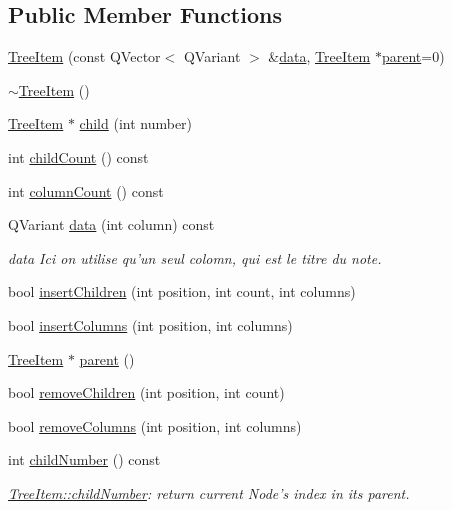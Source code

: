 \subsection*{Public Member Functions}
\begin{DoxyCompactItemize}
\item 
\hyperlink{class_tree_item_a1e3a29cf1a0d6ff0bbc2d2ef41723a13}{Tree\-Item} (const Q\-Vector$<$ Q\-Variant $>$ \&\hyperlink{class_tree_item_a16641e42c78f004d47a66f3b2c39341f}{data}, \hyperlink{class_tree_item}{Tree\-Item} $\ast$\hyperlink{class_tree_item_a392ec493dfab91ee474d7ff83e2c0211}{parent}=0)
\item 
\hyperlink{class_tree_item_a859429185d908c3e54861bbbfb185425}{$\sim$\-Tree\-Item} ()
\item 
\hyperlink{class_tree_item}{Tree\-Item} $\ast$ \hyperlink{class_tree_item_a993f98a911be40cc1466e105b4657bbe}{child} (int number)
\item 
int \hyperlink{class_tree_item_a55ffe6dd27750e479034b93e753f87af}{child\-Count} () const 
\item 
int \hyperlink{class_tree_item_a31c3fb89ad8e19ae696a310a1f843a8e}{column\-Count} () const 
\item 
Q\-Variant \hyperlink{class_tree_item_a16641e42c78f004d47a66f3b2c39341f}{data} (int column) const 
\begin{DoxyCompactList}\small\item\em data Ici on utilise qu'un seul colomn, qui est le titre du note. \end{DoxyCompactList}\item 
bool \hyperlink{class_tree_item_ad6b6da67cc03e79c714419f93f5005c6}{insert\-Children} (int position, int count, int columns)
\item 
bool \hyperlink{class_tree_item_aaed6e9bcd68a8e78876ab72fd000b7c8}{insert\-Columns} (int position, int columns)
\item 
\hyperlink{class_tree_item}{Tree\-Item} $\ast$ \hyperlink{class_tree_item_a392ec493dfab91ee474d7ff83e2c0211}{parent} ()
\item 
bool \hyperlink{class_tree_item_aa9861c44a34b210bde61527b9b5018f3}{remove\-Children} (int position, int count)
\item 
bool \hyperlink{class_tree_item_a71aa8096b2c4361906f6225134c65f78}{remove\-Columns} (int position, int columns)
\item 
int \hyperlink{class_tree_item_afadec3be086a04920b270c51e23b765b}{child\-Number} () const 
\begin{DoxyCompactList}\small\item\em \hyperlink{class_tree_item_afadec3be086a04920b270c51e23b765b}{Tree\-Item\-::child\-Number}\-: return current Node's index in its parent. \end{DoxyCompactList}\item 

\end{DoxyCompactItemize}
